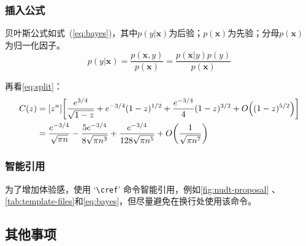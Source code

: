 \begin{table}[htb]
	\centering
	\caption{并排子表格}
	\label{tab:subtable}
	\hskip2cm
\end{table}

\subsubsection{插入公式}
贝叶斯公式如式~(\ref{eq:bayes})，其中$p(y|\boldsymbol{x})$为后验；$p(\boldsymbol{x})$为先验；分母$p(\boldsymbol{x})$ 为归一化因子。
\begin{equation}\label{eq:bayes}
	p(y|\boldsymbol{x}) = \frac{p(\boldsymbol{x},y)}{p(\boldsymbol{x})}=
	\frac{p(\boldsymbol{x}|y)p(y)}{p(\boldsymbol{x})}
\end{equation}

再看\cref{eq:split}：
\begin{equation}\label{eq:split}
	\begin{split}
		C(z) &= [z^n] \biggl[\frac{e^{3/4}}{\sqrt{1-z}} +
		e^{-3/4}(1-z)^{1/2} + \frac{e^{-3/4}}{4}(1-z)^{3/2}
		+ O\Bigl( (1-z)^{5/2}\Bigr)\biggr] \\
		&= \frac{e^{-3/4}}{\sqrt{\pi n}} - \frac{5e^{-3/4}}{8\sqrt{\pi
		n^3}} + \frac{e^{-3/4}}{128 \sqrt{\pi n^5}} +
		O\biggl(\frac{1}{\sqrt{\pi
		n^7}}\biggr)
	\end{split}
\end{equation}


\subsubsection{智能引用}
为了增加体验感，使用 `\verb|\cref|' 命令智能引用，例如\cref{fig:nudt-proposal} 、\cref{tab:template-files}和\cref{eq:bayes}，但尽量避免在换行处使用该命令。

\subsection{其他事项}
